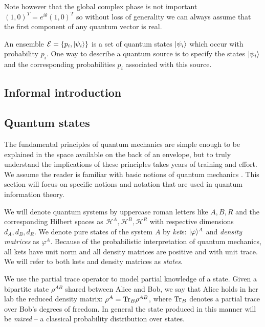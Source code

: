 \documentclass[aps,11pt,twoside,letterpaper]{article}
\def\Tr{\textup{Tr}}
\def\ph{\varphi}
\def\E{\mathcal{E}}
\def\cH{\mathcal{H}}
\theoremstyle{plain}
\theoremstyle{definition}
\begin{document}
        Note however that the global complex phase is not important $(1,0)^T= e^{i\theta}(1,0)^T$ so without loss
        of generality we can always assume that the first component of any quantum vector is real.


        An ensemble $\E=\{p_i, \ket{\psi_i} \}$ is a set of quantum states $| \psi_i \rangle$ which occur with 
        probability $p_i$. 
        One way to describe a quantum source is to specify the states $| \psi_i \rangle$ and the
        corresponding probabilities $p_i$ associated with this source. 


    \subsection{Informal introduction}

		

		\bigskip
		\subsection{Quantum states}
			
			The fundamental principles of quantum mechanics are simple enough to be explained in the space
			available on the back of an envelope, but to truly understand the implications of these
			principles takes years of training and effort.
			We assume the reader is familiar with basic notions of quantum mechanics \cite{sakurai,NC04}. 
			This section will focus on specific notions and notation that are used in quantum information theory.
			
			We will denote quantum systems by uppercase roman letters like $A,B,R$ and the corresponding 
			Hilbert spaces as $\cH^A, \cH^B, \cH^R$ with respective dimensions $d_A,d_B,d_R$.
		    We denote pure states of the system $A$ by \emph{ket}s: $\ket{\ph}^A$
		    and \emph{density matrices} as $\ph^A$.		%
			Because of the probabilistic interpretation of quantum mechanics, all kets have unit norm and all
			density matrices are positive and with unit trace.
		    We will refer to both kets and density matrices as \emph{states}.
		    
			We use the partial trace operator to model partial knowledge of a state.
			Given a bipartite state $\rho^{AB}$ shared between Alice and Bob, we say that Alice holds in her lab
			the reduced density matrix: $\rho^A = \Tr_B\rho^{AB}$, where $\Tr_B$ denotes a partial trace over 
			Bob's degrees of freedom.
			In general the state produced in this manner will be \emph{mixed} -- a classical probability distribution
			over states.
			
\end{document}
